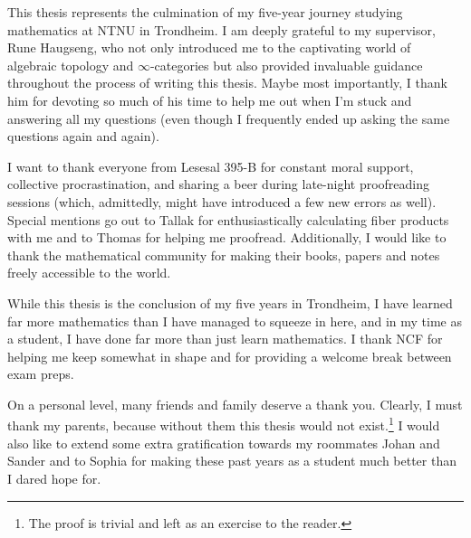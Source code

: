 \documentclass[../../thesis.tex]{subfiles}
\begin{document}
This thesis represents the culmination of my five-year journey studying mathematics at NTNU in Trondheim. I am deeply grateful to my supervisor, Rune Haugseng, who not only introduced me to the captivating world of algebraic topology and $\infty$-categories but also provided invaluable guidance throughout the process of writing this thesis.
Maybe most importantly, I thank him for devoting so much of his time to help me out when I'm stuck and answering all my questions (even though I frequently ended up asking the same questions again and again).


I want to thank everyone from Lesesal 395-B for constant moral support, collective procrastination, and sharing a beer during late-night proofreading sessions (which, admittedly, might have introduced a few new errors as well).
Special mentions go out to Tallak for enthusiastically calculating fiber products with me and to Thomas for helping me proofread.
Additionally, I would like to thank the mathematical community for making their books, papers and notes freely accessible to the world.


While this thesis is the conclusion of my five years in Trondheim, I have learned far more mathematics than I have managed to squeeze in here, and in my time as a student, I have done far more than just learn mathematics.
I thank NCF for helping me keep somewhat in shape and for providing a welcome break between exam preps.


On a personal level, many friends and family deserve a thank you.
Clearly, I must thank my parents, because without them this thesis would not exist.\footnote{The proof is trivial and left as an exercise to the reader.}
I would also like to extend some extra gratification towards my roommates Johan and Sander and to Sophia for making these past years as a student much better than I dared hope for.
\end{document}
